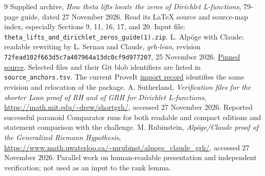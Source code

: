 \documentclass[11pt]{article}
\theoremstyle{remark}\newtheorem{remark}[theorem]{Remark}
\begin{document}
\renewcommand{\refname}{References and provenance}
\begin{thebibliography}{9}
 Supplied archive, \emph{How theta lifts locate the zeros of Dirichlet L-functions}, 79-page guide, dated 27 November 2026. Read its LaTeX source and source-map index, especially Sections 9, 11, 16, 17, and 20. Input file: \nolinkurl{theta_lifts_and_dirichlet_zeros_guide(1).zip}.
 L. Alp\"oge with Claude; readable rewriting by L. Sernau and Claude, \emph{grh-lean}, revision \texttt{72fead102f663d5c7a407964a13dc0cf9d977207}, 25 November 2026. \href{https://github.com/lsernau/grh-lean/tree/72fead102f663d5c7a407964a13dc0cf9d977207/grh}{Pinned source}. Selected files and their Git blob identifiers are listed in \texttt{source\_anchors.tsv}. The current ProveIt \href{https://github.com/VladimirReshetnikov/ProveIt/blob/main/Analysis/GeneralizedRiemannHypothesis/vendor/grh-lean/README.md}{import record} identifies the same revision and relocation of the package.
 A. Sutherland, \emph{Verification files for the shorter Lean proof of RH and of GRH for Dirichlet L-functions}, \url{https://math.mit.edu/~drew/shortgrh/}, accessed 27 November 2026. Reported successful paranoid Comparator runs for both readable and compact editions and statement comparison with the challenge.
 M. Rubinstein, \emph{Alp\"oge/Claude proof of the Generalized Riemann Hypothesis}, \url{https://www.math.uwaterloo.ca/~mrubinst/alpoge_claude_grh/}, accessed 27 November 2026. Parallel work on human-readable presentation and independent verification; not used as an input to the rank lemma.
\end{thebibliography}
\end{document}

